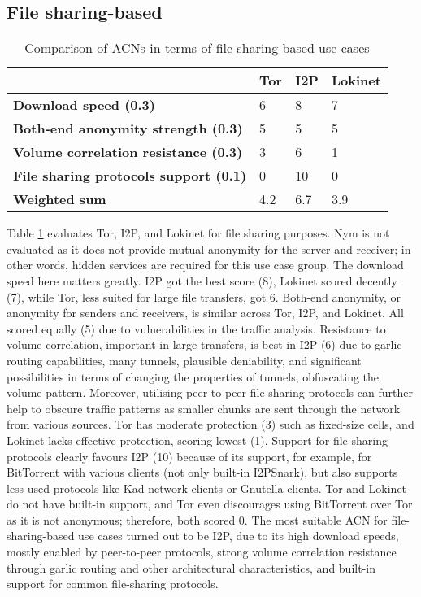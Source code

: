 \subsection{File sharing-based}

\begin{table}[!ht]
\caption{Comparison of ACNs in terms of file sharing-based use cases}
\label{tab:file_sharing_uc}
\small
\begin{tabular}{|p{}|p{}|p{}|p{}|}
\hline
\textbf{} & \textbf{Tor} & \textbf{I2P} & \textbf{Lokinet} \\
\hline
\textbf{Download speed (0.3)} & 6 & 8 & 7 \\
\hline
\textbf{Both-end anonymity strength (0.3)} & 5 & 5 & 5 \\
\hline
\textbf{Volume correlation resistance (0.3)} & 3 & 6 & 1 \\
\hline
\textbf{File sharing protocols support (0.1)} & 0 & 10 & 0 \\
\hline
\textbf{Weighted sum} & 4.2 & 6.7 & 3.9 \\
\hline
\end{tabular}
\end{table}

Table \ref{tab:file_sharing_uc} evaluates Tor, I2P, and Lokinet for file sharing purposes. Nym is not evaluated as it does not provide mutual anonymity for the server and receiver; in other words, hidden services are required for this use case group.
The download speed here matters greatly. I2P got the best score (8), Lokinet scored decently (7), while Tor, less suited for large file transfers, got 6.
Both-end anonymity, or anonymity for senders and receivers, is similar across Tor, I2P, and Lokinet. All scored equally (5) due to vulnerabilities in the traffic analysis.
Resistance to volume correlation, important in large transfers, is best in I2P (6) due to garlic routing capabilities, many tunnels, plausible deniability, and significant possibilities in terms of changing the properties of tunnels, obfuscating the volume pattern. Moreover, utilising peer-to-peer file-sharing protocols can further help to obscure traffic patterns as smaller chunks are sent through the network from various sources. Tor has moderate protection (3) such as fixed-size cells, and Lokinet lacks effective protection, scoring lowest (1).
Support for file-sharing protocols clearly favours I2P (10) because of its support, for example, for BitTorrent with various clients (not only built-in I2PSnark), but also supports less used protocols like Kad network clients or Gnutella clients. Tor and Lokinet do not have built-in support, and Tor even discourages using BitTorrent over Tor as it is not anonymous; therefore, both scored 0.
The most suitable ACN for file-sharing-based use cases turned out to be I2P, due to its high download speeds, mostly enabled by peer-to-peer protocols, strong volume correlation resistance through garlic routing and other architectural characteristics, and built-in support for common file-sharing protocols.

